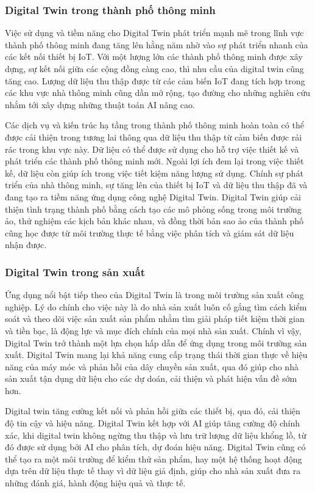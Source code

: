 \subsubsection{Digital Twin trong thành phố thông minh}

Việc sử dụng và tiềm năng cho Digital Twin phát triển mạnh mẽ trong lĩnh vực thành phố thông minh đang tăng lên hằng năm nhờ vào sự phát triển nhanh của các kết nối thiết bị IoT. Với một lượng lớn các thành phố thông minh được xây dựng, sự kết nối giữa các cộng đồng càng cao, thì nhu cầu của digital twin cũng tăng cao. Lượng dữ liệu thu thập được từ các cảm biến IoT đang tích hợp trong các khu vực nhà thông minh cũng dần mở rộng, tạo đường cho những nghiên cứu nhắm tới xây dựng những thuật toán AI nâng cao.

Các dịch vụ và kiến trúc hạ tầng trong thành phố thông minh hoàn toàn có thể được cải thiện trong tương lai thông qua dữ liệu thu thập từ cảm biến được rải rác trong khu vực này. Dữ liệu có thể được sử dụng cho hỗ trợ việc thiết kế và phát triển các thành phố thông minh mới. Ngoài lợi ích đem lại trong việc thiết kế, dữ liệu còn giúp ích trong việc tiết kiệm năng lượng sử dụng. Chính sự phát triển của nhà thông minh, sự tăng lên của thiết bị IoT và dữ liệu thu thập đã và đang tạo ra tiềm năng ứng dụng công nghệ Digital Twin. Digital Twin giúp cải thiện tình trạng thành phố bằng cách tạo các mô phỏng sống trong môi trường ảo, thử nghiệm các kịch bản khác nhau, và đồng thời bản sao ảo của thành phố cũng học được từ môi trường thực tế bằng việc phân tích và giám sát dữ liệu nhận được.

\subsubsection{Digital Twin trong sản xuất}

Ứng dụng nổi bật tiếp theo của Digital Twin là trong môi trường sản xuất công nghiệp. Lý do chính cho việc này là do nhà sản xuất luôn cố gắng tìm cách kiểm soát và theo dõi việc sản xuất sản phẩm nhằm tìm giải pháp tiết kiệm thời gian và tiền bạc, là động lực và mục đích chính của mọi nhà sản xuất. Chính vì vậy, Digital Twin trở thành một lựa chọn hấp dẫn để ứng dụng trong môi trường sản xuất. Digital Twin mang lại khả năng cung cấp trạng thái thời gian thực về hiệu năng của máy móc và phản hồi của dây chuyền sản xuất, qua đó giúp cho nhà sản xuất tận dụng dữ liệu cho các dự doán, cải thiện và phát hiện vấn đề sớm hơn. 

Digital twin tăng cường kết nối và phản hồi giữa các thiết bị, qua đó, cải thiện độ tin cậy và hiệu năng. Digital Twin kết hợp với AI giúp tăng cường độ chính xác, khi digital twin không ngừng thu thập và lưu trữ lượng dữ liệu khổng lồ, từ đó được sử dụng bởi AI cho phân tích, dự đoán hiệu năng. Digital Twin cũng có thể tạo ra một môi trường để kiểm thử sản phẩm, hay một hệ thống hoạt động dựa trên dữ liệu thực tế thay vì dữ liệu giả định, giúp cho nhà sản xuất đưa ra những đánh giá, hành động hiệu quả và thực tế.

